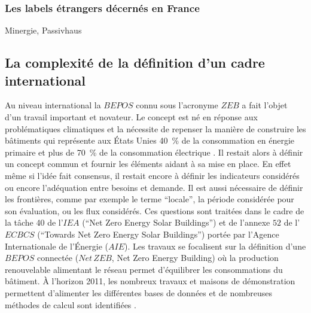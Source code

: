 \subsubsection{Les labels étrangers décernés en France} %
\label{ssub:les_labels_etrangers_decernes_en_france}

Minergie, Passivhaus




\subsection{La complexité de la définition d’un cadre international} %
\label{sub:la_definition_d_un_cadre_international}
Au niveau international la $BEPOS$ connu sous l’acronyme $ZEB$ a fait l’objet d’un
travail important et novateur.
Le concept est né en réponse aux problématiques climatiques et la nécessite
de repenser la manière de construire les bâtiments qui représente aux États Unies
\SI{40}{\percent} de la consommation en énergie primaire et plus de \SI{70}{\percent}
de la consommation électrique \parencite{Torcellini2006a}. Il
restait alors à définir un concept commun et fournir les éléments aidant à sa mise en
place. En effet même si l’idée fait consensus, il restait encore à définir les indicateurs
considérés ou encore l’adéquation entre besoins et demande.
Il est aussi nécessaire de définir les frontières, comme par exemple le terme \enquote{locale},
la période considérée pour son évaluation, ou les flux considérés. Ces questions sont traitées
dans le cadre de la tâche 40 de l’$IEA$ (\enquote{Net Zero Energy Solar Buildings}) et de l’annexe $52$ de
l’$ECBCS$ (\enquote{Towards Net Zero Energy Solar Buildings}) portée par l’Agence Internationale
de l’Énergie ($AIE$). Les travaux se focalisent
sur la définition d’une $BEPOS$ connectée ($Net\,ZEB$, Net Zero Energy Building) où
la production renouvelable alimentant le réseau permet d’équilibrer les consommations du bâtiment.
À l’horizon 2011, les nombreux travaux et maisons de démonstration permettent d’alimenter
les différentes bases de données et de nombreuses méthodes de calcul sont identifiées
\parencite{Marszal2011971}.


